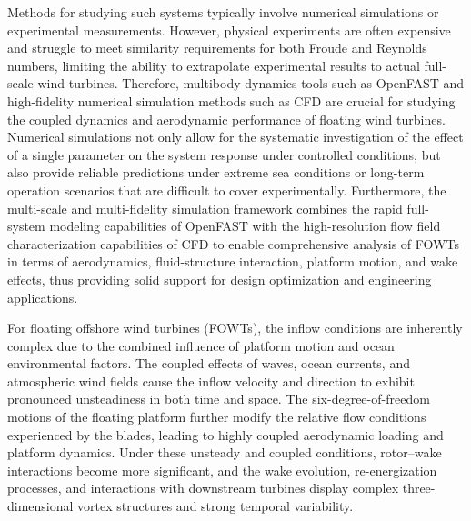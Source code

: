 \documentclass[%
 aip,
 amsmath,amssymb,
 reprint,%
]{revtex4-1}
\begin{document}
Methods for studying such systems typically involve numerical simulations or experimental measurements\citet{duan2016model, yang2019experimental}. However, physical experiments are often expensive and struggle to meet similarity requirements for both Froude and Reynolds numbers, limiting the ability to extrapolate experimental results to actual full-scale wind turbines. Therefore, multibody dynamics tools such as OpenFAST \citet{thomsen2021modeling, wang2022oc6} and high-fidelity numerical simulation methods such as CFD are crucial for studying the coupled dynamics and aerodynamic performance of floating wind turbines. Numerical simulations not only allow for the systematic investigation of the effect of a single parameter on the system response under controlled conditions, but also provide reliable predictions under extreme sea conditions or long-term operation scenarios that are difficult to cover experimentally. Furthermore, the multi-scale and multi-fidelity simulation framework combines the rapid full-system modeling capabilities of OpenFAST with the high-resolution flow field characterization capabilities of CFD to enable comprehensive analysis of FOWTs in terms of aerodynamics, fluid-structure interaction, platform motion, and wake effects, thus providing solid support for design optimization and engineering applications.

For floating offshore wind turbines (FOWTs), the inflow conditions are inherently complex due to the combined influence of platform motion and ocean environmental factors. The coupled effects of waves, ocean currents, and atmospheric wind fields cause the inflow velocity and direction to exhibit pronounced unsteadiness in both time and space. The six-degree-of-freedom motions of the floating platform further modify the relative flow conditions experienced by the blades, leading to highly coupled aerodynamic loading and platform dynamics\citet{tran2016fully}. Under these unsteady and coupled conditions, rotor–wake interactions become more significant, and the wake evolution, re-energization processes, and interactions with downstream turbines display complex three-dimensional vortex structures and strong temporal variability.
\end{document}

